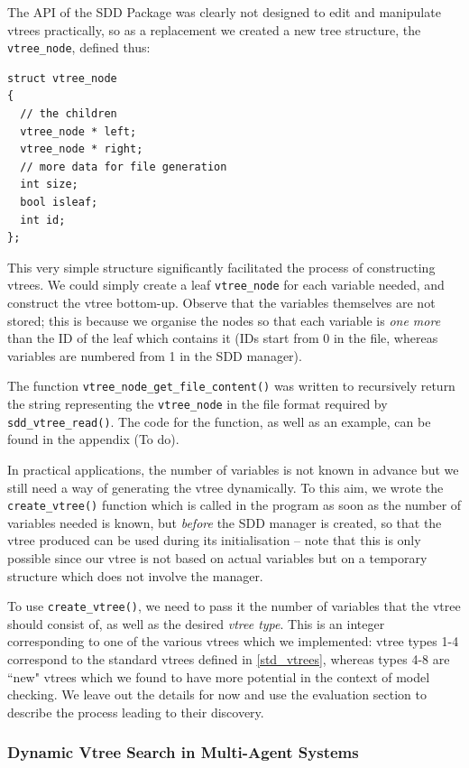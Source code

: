 \documentclass[11pt]{article}
\begin{document}
The API of the SDD Package was clearly not designed to edit and manipulate vtrees practically, so as a replacement we created a new tree structure, the \texttt{vtree\_node}, defined thus: 
\begin{verbatim}
struct vtree_node 
{
  // the children
  vtree_node * left; 
  vtree_node * right;
  // more data for file generation
  int size;
  bool isleaf;
  int id;
};
\end{verbatim}

This very simple structure significantly facilitated the process of constructing vtrees. We could simply create a leaf \texttt{vtree\_node} for each variable needed, and construct the vtree bottom-up. Observe that the variables themselves are not stored; this is because we organise the nodes so that each variable is \textit{one more} than the ID of the leaf which contains it (IDs start from 0 in the file, whereas variables are numbered from 1 in the SDD manager).

 The function \texttt{vtree\_node\_get\_file\_content()} was written to recursively return the string representing the \texttt{vtree\_node} in the file format required by \texttt{sdd\_vtree\_read()}. The code for the function, as well as an example, can be found in the appendix (To do). 

In practical applications, the number of variables is not known in advance but we still need a way of generating the vtree dynamically. To this aim, we wrote the \texttt{create\_vtree()} function which is called in the program as soon as the number of variables needed is known, but \textit{before} the SDD manager is created, so that the vtree produced can be used during its initialisation -- note that this is only possible since our vtree is not based on actual variables but on a temporary structure which does not involve the manager. 

To use \texttt{create\_vtree()}, we need to pass it the number of variables that the vtree should consist of, as well as the desired \textit{vtree type}. This is an integer corresponding to one of the various vtrees which we implemented: vtree types 1-4 correspond to the standard vtrees defined in \ref{std_vtrees}, whereas types 4-8 are ``new" vtrees which we found to have more potential in the context of model checking. We leave out the details for now and use the evaluation section to describe the process leading to their discovery. 

\subsubsection{Dynamic Vtree Search in Multi-Agent Systems}
\end{document}
